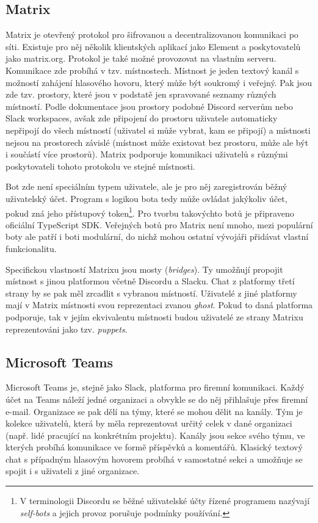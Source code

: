 \documentclass[FM]{tulthesis}
\begin{document}
	\subsection{Matrix}
	
	Matrix je otevřený protokol pro šifrovanou a decentralizovanou komunikaci po síti. Existuje pro něj několik klientských aplikací jako Element a poskytovatelů jako matrix.org. Protokol je také možné provozovat na vlastním serveru. Komunikace zde probíhá v tzv. místnostech. Místnost je jeden textový kanál s možností zahájení hlasového hovoru, který může být soukromý i veřejný. Pak jsou zde tzv. prostory, které jsou v podstatě jen spravované seznamy různých místností. Podle dokumentace jsou prostory podobné Discord serverům nebo Slack workspaces, avšak zde připojení do prostoru uživatele automaticky nepřipojí do všech místností (uživatel si může vybrat, kam se připojí) a místnosti nejsou na prostorech závislé (místnost může existovat bez prostoru, může ale být i součástí více prostorů). Matrix podporuje komunikaci uživatelů s různými poskytovateli tohoto protokolu ve stejné místnosti.
	
	Bot zde není speciálním typem uživatele, ale je pro něj zaregistrován běžný uživatelský účet. Program s logikou bota tedy může ovládat jakýkoliv účet, pokud zná jeho přístupový token\footnote{V terminologii Discordu se běžné uživatelské účty řízené programem nazývají \textit{self-bots} a jejich provoz porušuje podmínky používání.}. Pro tvorbu takovýchto botů je připraveno oficiální \mbox{TypeScript} SDK. Veřejných botů pro Matrix není mnoho, mezi populární boty ale patří i boti modulární, do nichž mohou ostatní vývojáři přidávat vlastní funkcionalitu.
	
	Specifickou vlastností Matrixu jsou mosty (\textit{bridges}). Ty umožňují propojit místnost s jinou platformou včetně  Discordu a Slacku. Chat z platformy třetí strany by se pak měl zrcadlit s vybranou místností. Uživatelé z jiné platformy mají v Matrix místnosti svou reprezentaci zvanou \textit{ghost}. Pokud to daná platforma podporuje, tak v jejím ekvivalentu místnosti budou uživatelé ze strany Matrixu reprezentováni jako tzv. \textit{puppets}. \cite{doc_Matrix}
	
	\subsection{Microsoft Teams}
	
	Microsoft Teams je, stejně jako Slack, platforma pro firemní komunikaci. Každý účet na Teams náleží jedné organizaci a obvykle se do něj přihlašuje přes firemní e-mail. Organizace se pak dělí na týmy, které se mohou dělit na kanály. Tým je kolekce uživatelů, která by měla reprezentovat určitý celek v dané organizaci (např. lidé pracující na konkrétním projektu). Kanály jsou sekce svého týmu, ve kterých probíhá komunikace ve formě příspěvků a komentářů. Klasický textový chat s případným hlasovým hovorem probíhá v samostatné sekci a umožňuje se spojit i s uživateli z jiné organizace.
	
\end{document}
